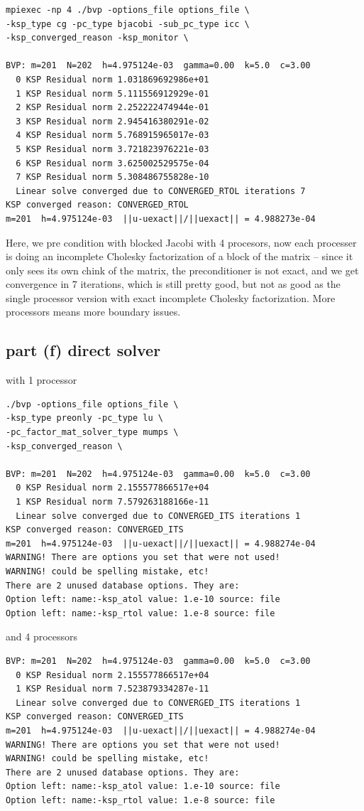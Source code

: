 \documentclass[12pt]{article}
\begin{document}
\begin{verbatim}
mpiexec -np 4 ./bvp -options_file options_file \
-ksp_type cg -pc_type bjacobi -sub_pc_type icc \
-ksp_converged_reason -ksp_monitor \

BVP: m=201  N=202  h=4.975124e-03  gamma=0.00  k=5.0  c=3.00
  0 KSP Residual norm 1.031869692986e+01
  1 KSP Residual norm 5.111556912929e-01
  2 KSP Residual norm 2.252222474944e-01
  3 KSP Residual norm 2.945416380291e-02
  4 KSP Residual norm 5.768915965017e-03
  5 KSP Residual norm 3.721823976221e-03
  6 KSP Residual norm 3.625002529575e-04
  7 KSP Residual norm 5.308486755828e-10
  Linear solve converged due to CONVERGED_RTOL iterations 7
KSP converged reason: CONVERGED_RTOL
m=201  h=4.975124e-03  ||u-uexact||/||uexact|| = 4.988273e-04
\end{verbatim}

Here, we pre condition with blocked Jacobi with 4 procesors, now each processer is doing an incomplete Cholesky factorization of a block of the matrix -- since it only sees its own chink of the matrix, the preconditioner is not exact, and we get convergence in 7 iterations, which is still pretty good, but not as good as the single processor version with exact incomplete Cholesky factorization. More processors means more boundary issues.

\subsection{part (f) direct solver}



with 1 processor
\begin{verbatim}
./bvp -options_file options_file \
-ksp_type preonly -pc_type lu \
-pc_factor_mat_solver_type mumps \
-ksp_converged_reason \

BVP: m=201  N=202  h=4.975124e-03  gamma=0.00  k=5.0  c=3.00
  0 KSP Residual norm 2.155577866517e+04
  1 KSP Residual norm 7.579263188166e-11
  Linear solve converged due to CONVERGED_ITS iterations 1
KSP converged reason: CONVERGED_ITS
m=201  h=4.975124e-03  ||u-uexact||/||uexact|| = 4.988274e-04
WARNING! There are options you set that were not used!
WARNING! could be spelling mistake, etc!
There are 2 unused database options. They are:
Option left: name:-ksp_atol value: 1.e-10 source: file
Option left: name:-ksp_rtol value: 1.e-8 source: file
\end{verbatim}

and 4 processors
\begin{verbatim}
BVP: m=201  N=202  h=4.975124e-03  gamma=0.00  k=5.0  c=3.00
  0 KSP Residual norm 2.155577866517e+04
  1 KSP Residual norm 7.523879334287e-11
  Linear solve converged due to CONVERGED_ITS iterations 1
KSP converged reason: CONVERGED_ITS
m=201  h=4.975124e-03  ||u-uexact||/||uexact|| = 4.988274e-04
WARNING! There are options you set that were not used!
WARNING! could be spelling mistake, etc!
There are 2 unused database options. They are:
Option left: name:-ksp_atol value: 1.e-10 source: file
Option left: name:-ksp_rtol value: 1.e-8 source: file

\end{verbatim}
\end{document}
